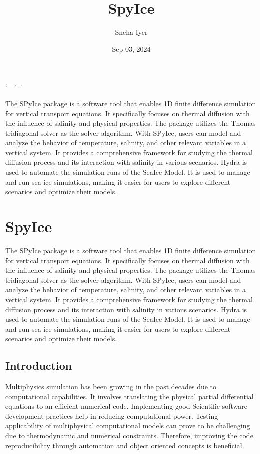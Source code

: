 \documentclass[a4paper,11pt,english,openany]{sphinxmanual}
\title{SpyIce}
\date{Sep 03, 2024}
\author{Sneha Iyer}
\begin{document}
\ifdefined\shorthandoff
  \ifnum\catcode`\=\string=\active\shorthandoff{=}\fi
  \ifnum\catcode`\"=\active{}\fi
\fi

\pagestyle{empty}
\sphinxmaketitle
\pagestyle{plain}
\sphinxtableofcontents
\pagestyle{normal}
\label{\detokenize{index::doc}}


\sphinxAtStartPar
The SPyIce package is a software tool that enables 1D finite difference simulation for vertical transport equations. It specifically focuses on thermal diffusion with the influence of salinity and physical properties. The package utilizes the Thomas tridiagonal solver as the solver algorithm. With SPyIce, users can model and analyze the behavior of temperature, salinity, and other relevant variables in a vertical system. It provides a comprehensive framework for studying the thermal diffusion process and its interaction with salinity in various scenarios. Hydra is used to automate the simulation runs of the Sea\sphinxhyphen{}Ice Model. It is used to manage and run sea ice simulations, making it easier for users to explore different scenarios and optimize their models.

\sphinxstepscope


\chapter{SpyIce}
\label{\detokenize{report/_index:spyice}}\label{\detokenize{report/_index::doc}}
\sphinxAtStartPar
The SPyIce package is a software tool that enables 1D finite difference simulation for vertical transport equations. It specifically focuses on thermal diffusion with the influence of salinity and physical properties. The package utilizes the Thomas tridiagonal solver as the solver algorithm. With SPyIce, users can model and analyze the behavior of temperature, salinity, and other relevant variables in a vertical system. It provides a comprehensive framework for studying the thermal diffusion process and its interaction with salinity in various scenarios. Hydra is used to automate the simulation runs of the Sea\sphinxhyphen{}Ice Model. It is used to manage and run sea ice simulations, making it easier for users to explore different scenarios and optimize their models.

\sphinxstepscope


\section{Introduction}
\label{\detokenize{report/introduction:introduction}}\label{\detokenize{report/introduction::doc}}
\sphinxAtStartPar
Multiphysics simulation has been growing in the past decades due to computational capabilities. It involves translating the
physical partial differential equations to an efficient numerical code. Implementing good Scientific software development
practices help in reducing computational power. Testing applicability of multiphysical computational models can prove to be
challenging due to thermodynamic and numerical constraints. Therefore, improving the code reproducibility through
automation and object oriented concepts is beneficial.
\end{document}
